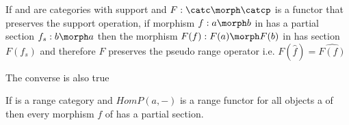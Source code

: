 \begin{observation}
If \catcw and \catcpw are  categories with support 
and $F: \catc \morph \catcp$ is a functor that preserves the support operation,
 if morphism $f: a \morph b$ in \catcw
has a partial section $f_s: b \morph a$ then 
the morphism $F(f) : F(a) \morph F(b)$ in \catcpw has section
$F(f_s)$ and therefore $F$ preserves the pseudo range operator 
i.e. $F(\hat{f}) = \widehat{F(f)}$ 
\end{observation}

The converse is also true 
\begin{lemma}
If \catcw is a range category and $HomP(a,-)$ is a range functor for all objects a of \catcw
then every morphism $f$ of \catcw has a partial section. 
\end{lemma}
